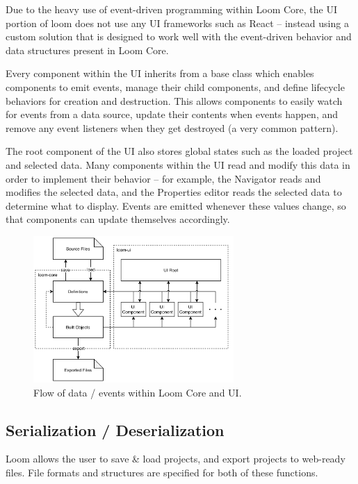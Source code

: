 \documentclass[conference, letterpaper]{IEEEtran}
\begin{document}
Due to the heavy use of event-driven programming within Loom Core, the UI portion of loom does not use any UI frameworks such as React -- instead using a custom solution that is designed to work well with the event-driven behavior and data structures present in Loom Core.

Every component within the UI inherits from a base class which enables components to emit events, manage their child components, and define lifecycle behaviors for creation and destruction. This allows components to easily watch for events from a data source, update their contents when events happen, and remove any event listeners when they get destroyed (a very common pattern).

The root component of the UI also stores global states such as the loaded project and selected data. Many components within the UI read and modify this data in order to implement their behavior -- for example, the Navigator reads and modifies the selected data, and the Properties editor reads the selected data to determine what to display. Events are emitted whenever these values change, so that components can update themselves accordingly.

\begin{figure}[!t]
  \centering
  \includegraphics[width=3in]{../dataflow.png}
  \caption{Flow of data / events within Loom Core and UI.}
  \label{fig:dataflow}
\end{figure}

\subsection{Serialization / Deserialization}
Loom allows the user to save \& load projects, and export projects to web-ready files. File formats and structures are specified for both of these functions.
\end{document}
